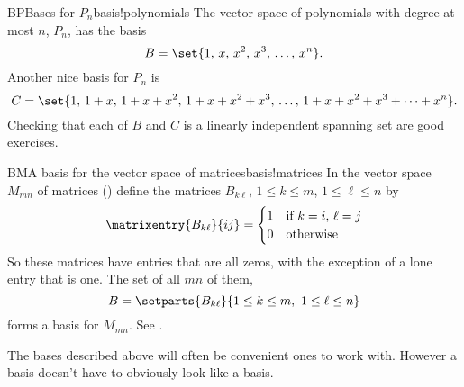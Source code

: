 %
\begin{example}{BP}{Bases for $P_n$}{basis!polynomials}
The vector space of polynomials with degree at most $n$, $P_n$, has the basis
%
\begin{equation*}
B=\set{1,\,x,\,x^2,\,x^3,\,\ldots,\,x^n}.
\end{equation*}
%
Another nice basis for $P_n$ is
%
\begin{equation*}
C=\set{1,\,1+x,\,1+x+x^2,\,1+x+x^2+x^3,\,\ldots,\,1+x+x^2+x^3+\cdots+x^n}.
\end{equation*}
%
Checking that each of $B$ and $C$ is a linearly independent spanning set are good exercises.
\end{example}
%
\begin{example}{BM}{A basis for the vector space of matrices}{basis!matrices}
In the vector space $M_{mn}$ of matrices ()  define the matrices $B_{k\ell}$, $1\leq k\leq m$, $1\leq\ell\leq n$ by
%
\begin{equation*}
\matrixentry{B_{k\ell}}{ij}=\begin{cases}
1&\text{if }k=i,\,\ell=j\\
0&\text{otherwise}
\end{cases}
\end{equation*}
%
So these matrices have entries that are all zeros, with the exception of a lone entry that is one.  The set of all $mn$ of them,
%
\begin{equation*}
B=\setparts{B_{k\ell}}{1\leq k\leq m,\ 1\leq\ell\leq n}
\end{equation*}
%
forms a basis for $M_{mn}$.  See .
\end{example}
%
The bases described above will often be convenient ones to work with.  However a basis doesn't have to obviously look like a basis.
%
%
